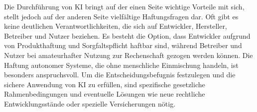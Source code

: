 \documentclass{report}
\begin{document}
Die Durchführung von KI bringt auf der einen Seite wichtige Vorteile mit sich, stellt jedoch auf der anderen Seite vielfältige Haftungsfragen dar. Oft gibt es keine deutlichen Verantwortlichkeiten, die sich auf Entwickler, Hersteller, Betreiber und Nutzer beziehen. Es besteht die Option, dass Entwickler aufgrund von Produkthaftung und Sorgfaltspflicht haftbar sind, während Betreiber und Nutzer bei amateurhafter Nutzung zur Rechenschaft gezogen werden können. Die Haftung autonomer Systeme, die ohne menschliche Einmischung handeln, ist besonders anspruchsvoll. Um die Entscheidungsbefugnis festzulegen und die sichere Anwendung von KI zu erfüllen, sind spezifische gesetzliche Rahmenbedingungen und eventuelle Lösungen wie neue rechtliche Entwicklungsstände oder spezielle Versicherungen nötig.


\nocite{*}
\printbibliography
\end{document}
